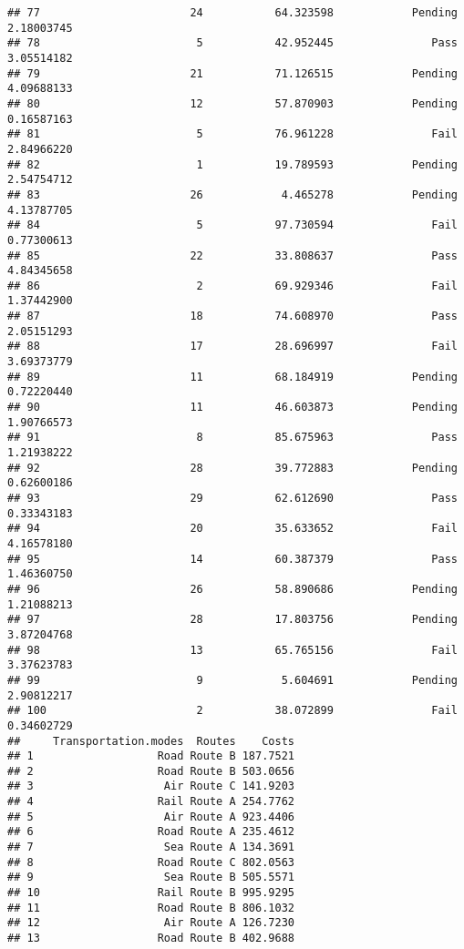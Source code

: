 \documentclass[
]{article}
\begin{document}
\begin{verbatim}
## 77                       24           64.323598            Pending   2.18003745
## 78                        5           42.952445               Pass   3.05514182
## 79                       21           71.126515            Pending   4.09688133
## 80                       12           57.870903            Pending   0.16587163
## 81                        5           76.961228               Fail   2.84966220
## 82                        1           19.789593            Pending   2.54754712
## 83                       26            4.465278            Pending   4.13787705
## 84                        5           97.730594               Fail   0.77300613
## 85                       22           33.808637               Pass   4.84345658
## 86                        2           69.929346               Fail   1.37442900
## 87                       18           74.608970               Pass   2.05151293
## 88                       17           28.696997               Fail   3.69373779
## 89                       11           68.184919            Pending   0.72220440
## 90                       11           46.603873            Pending   1.90766573
## 91                        8           85.675963               Pass   1.21938222
## 92                       28           39.772883            Pending   0.62600186
## 93                       29           62.612690               Pass   0.33343183
## 94                       20           35.633652               Fail   4.16578180
## 95                       14           60.387379               Pass   1.46360750
## 96                       26           58.890686            Pending   1.21088213
## 97                       28           17.803756            Pending   3.87204768
## 98                       13           65.765156               Fail   3.37623783
## 99                        9            5.604691            Pending   2.90812217
## 100                       2           38.072899               Fail   0.34602729
##     Transportation.modes  Routes    Costs
## 1                   Road Route B 187.7521
## 2                   Road Route B 503.0656
## 3                    Air Route C 141.9203
## 4                   Rail Route A 254.7762
## 5                    Air Route A 923.4406
## 6                   Road Route A 235.4612
## 7                    Sea Route A 134.3691
## 8                   Road Route C 802.0563
## 9                    Sea Route B 505.5571
## 10                  Rail Route B 995.9295
## 11                  Road Route B 806.1032
## 12                   Air Route A 126.7230
## 13                  Road Route B 402.9688

\end{verbatim}
\end{document}

